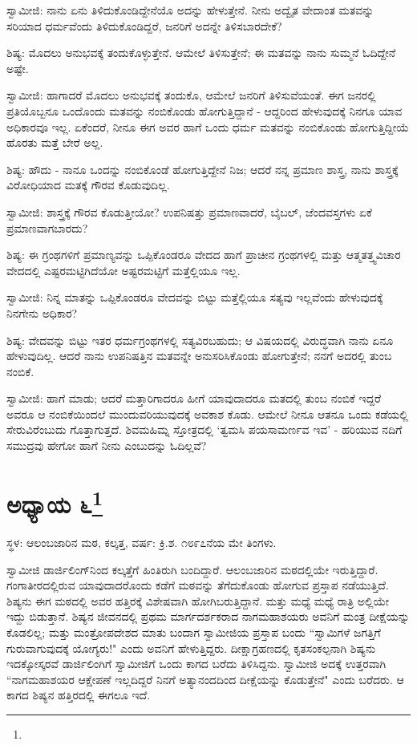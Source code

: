 ಸ್ವಾಮೀಜಿ: ನಾನು ಏನು ತಿಳಿದುಕೊಂಡಿದ್ದೇನೆಯೊ ಅದನ್ನು ಹೇಳುತ್ತೇನೆ. ನೀನು ಅದ್ವೈತ ವೇದಾಂತ ಮತವನ್ನು ಸರಿಯಾದ ಧರ್ಮವೆಂದು ತಿಳಿದುಕೊಂಡಿದ್ದರೆ, ಜನರಿಗೆ ಅದನ್ನೇ ತಿಳಿಸಬಾರದೇಕೆ?

ಶಿಷ್ಯ: ಮೊದಲು ಅನುಭವಕ್ಕೆ ತಂದುಕೊಳ್ಳುತ್ತೇನೆ. ಆಮೇಲೆ ತಿಳಿಸುತ್ತೇನೆ; ಈ ಮತವನ್ನು ನಾನು ಸುಮ್ಮನೆ ಓದಿದ್ದೇನೆ ಅಷ್ಟೇ.

ಸ್ವಾಮೀಜಿ: ಹಾಗಾದರೆ ಮೊದಲು ಅನುಭವಕ್ಕೆ ತಂದುಕೊ, ಆಮೇಲೆ ಜನರಿಗೆ ತಿಳಿಸುವೆಯಂತೆ. ಈಗ ಜನರಲ್ಲಿ ಪ್ರತಿಯೊಬ್ಬನೂ ಒಂದೊಂದು ಮತವನ್ನು ನಂಬಿಕೊಂಡು ಹೋಗುತ್ತಿದ್ದಾನೆ - ಆದ್ದರಿಂದ ಹೇಳುವುದಕ್ಕೆ ನಿನಗೂ ಯಾವ ಅಧಿಕಾರವೂ ಇಲ್ಲ. ಏಕೆಂದರೆ, ನೀನೂ ಈಗ ಅವರ ಹಾಗೆ ಒಂದು ಧರ್ಮ ಮತವನ್ನು ನಂಬಿಕೊಂಡು ಹೋಗುತ್ತಿದ್ದೀಯೆ ಹೊರತು ಮತ್ತೆ ಬೇರೆ ಅಲ್ಲ.

ಶಿಷ್ಯ: ಹೌದು - ನಾನೂ ಒಂದನ್ನು ನಂಬಿಕೊಂಡೆ ಹೋಗುತ್ತಿದ್ದೇನೆ ನಿಜ; ಆದರೆ ನನ್ನ ಪ್ರಮಾಣ ಶಾಸ್ತ್ರ, ನಾನು ಶಾಸ್ತ್ರಕ್ಕೆ ವಿರೋಧಿಯಾದ ಮತಕ್ಕೆ ಗೌರವ ಕೊಡುವುದಿಲ್ಲ.

ಸ್ವಾಮೀಜಿ: ಶಾಸ್ತ್ರಕ್ಕೆ ಗೌರವ ಕೊಡುತ್ತೀಯೋ? ಉಪನಿಷತ್ತು ಪ್ರಮಾಣವಾದರೆ, ಬೈಬಲ್, ಜೆಂದವಸ್ತಗಳು ಏಕೆ ಪ್ರಮಾಣವಾಗಬಾರದು?

ಶಿಷ್ಯ: ಈ ಗ್ರಂಥಗಳಿಗೆ ಪ್ರಮಾಣ್ಯವನ್ನು ಒಪ್ಪಿಕೊಂಡರೂ ವೇದದ ಹಾಗೆ ಪ್ರಾಚೀನ ಗ್ರಂಥಗಳಲ್ಲಿ ಮತ್ತು ಆತ್ಮತತ್ತ್ವವಿಚಾರ ವೇದದಲ್ಲಿ ಎಷ್ಟರಮಟ್ಟಿಗಿದೆಯೋ ಅಷ್ಟರಮಟ್ಟಿಗೆ ಮತ್ತೆಲ್ಲಿಯೂ ಇಲ್ಲ.

ಸ್ವಾಮೀಜಿ: ನಿನ್ನ ಮಾತನ್ನು ಒಪ್ಪಿಕೊಂಡರೂ ವೇದವನ್ನು ಬಿಟ್ಟು ಮತ್ತೆಲ್ಲಿಯೂ ಸತ್ಯವು ಇಲ್ಲವೆಂದು ಹೇಳುವುದಕ್ಕೆ ನಿನಗೇನು ಅಧಿಕಾರ?

ಶಿಷ್ಯ: ವೇದವನ್ನು ಬಿಟ್ಟು ಇತರ ಧರ್ಮಗ್ರಂಥಗಳಲ್ಲಿ ಸತ್ಯವಿರಬಹುದು; ಆ ವಿಷಯದಲ್ಲಿ ವಿರುದ್ಧವಾಗಿ ನಾನು ಏನೂ ಹೇಳುವುದಿಲ್ಲ. ಆದರೆ ನಾನು ಉಪನಿಷತ್ತಿನ ಮತವನ್ನೇ ಅನುಸರಿಸಿಕೊಂಡು ಹೋಗುತ್ತೇನೆ; ನನಗೆ ಅದರಲ್ಲಿ ತುಂಬ ನಂಬಿಕೆ.

ಸ್ವಾಮೀಜಿ: ಹಾಗೆ ಮಾಡು; ಆದರೆ ಮತ್ತಾರಿಗಾದರೂ ಹೀಗೆ ಯಾವುದಾದರೂ ಮತದಲ್ಲಿ ತುಂಬ ನಂಬಿಕೆ ಇದ್ದರೆ ಅವರೂ ಆ ನಂಬಿಕೆಯಿಂದಲೆ ಮುಂದುವರಿಯುವುದಕ್ಕೆ ಅವಕಾಶ ಕೊಡು. ಆಮೇಲೆ ನೀನೂ ಆತನೂ ಒಂದು ಕಡೆಯಲ್ಲಿ ಸೇರುವಿರೆಂಬುದು ಗೊತ್ತಾಗುತ್ತದೆ. ಶಿವಮಹಿಮ್ನ ಸ್ತೋತ್ರದಲ್ಲಿ ‘ತ್ವಮಸಿ ಪಯಸಾಮರ್ಣವ ಇವ’ - ಹರಿಯುವ ನದಿಗೆ ಸಮುದ್ರವು ಹೇಗೋ ಹಾಗೆ ನೀನು ಎಂಬುದನ್ನು ಓದಿಲ್ಲವೆ?

\newpage

\chapter[ಅಧ್ಯಾಯ ೬]{ಅಧ್ಯಾಯ ೬\protect\footnote{}}

\begin{center}
ಸ್ಥಳ: ಆಲಂಬಜಾರಿನ ಮಠ, ಕಲ್ಕತ್ತ, ವರ್ಷ: ಕ್ರಿ.ಶ. ೧೮೯೭ನೆಯ ಮೇ ತಿಂಗಳು.
\end{center}

ಸ್ವಾಮೀಜಿ ಡಾರ್ಜಿಲಿಂಗ್‌ನಿಂದ ಕಲ್ಕತ್ತೆಗೆ ಹಿಂತಿರುಗಿ ಬಂದಿದ್ದಾರೆ. ಆಲಂಬಜಾರಿನ ಮಠದಲ್ಲಿಯೇ ಇರುತ್ತಿದ್ದಾರೆ. ಗಂಗಾತೀರದಲ್ಲಿರುವ ಯಾವುದಾದರೊಂದು ಕಡೆಗೆ ಮಠವನ್ನು ತೆಗೆದುಕೊಂಡು ಹೋಗುವ ಪ್ರಸ್ತಾಪ ನಡೆಯುತ್ತಿದೆ. ಶಿಷ್ಯನು ಈಗ ಮಠದಲ್ಲಿ ಅವರ ಹತ್ತಿರಕ್ಕೆ ವಿಶೇಷವಾಗಿ ಹೋಗಿಬರುತ್ತಿದ್ದಾನೆ. ಮತ್ತು ಮಧ್ಯೆ ಮಧ್ಯೆ ರಾತ್ರಿ ಅಲ್ಲಿಯೇ ಇದ್ದು ಬಿಡುತ್ತಾನೆ. ಶಿಷ್ಯನ ಜೀವನದಲ್ಲಿ ಪ್ರಥಮ ಮಾರ್ಗದರ್ಶಕರಾದ ನಾಗಮಹಾಶಯರು ಅವನಿಗೆ ಮಂತ್ರ ದೀಕ್ಷೆಯನ್ನು ಕೊಡಲಿಲ್ಲ; ಮತ್ತು ಮಂತ್ರೋಪದೇಶದ ಮಾತು ಬಂದಾಗ ಸ್ವಾಮೀಜಿಯ ಪ್ರಸ್ತಾಪ ಬಂದು “ಸ್ವಾಮಿಗಳೆ ಜಗತ್ತಿಗೆ ಗುರುವಾಗುವುದಕ್ಕೆ ಯೋಗ್ಯರು!" ಎಂದು ಅವನಿಗೆ ಹೇಳುತ್ತಿದ್ದರು. ದೀಕ್ಷಾಗ್ರಹಣದಲ್ಲಿ ಕೃತಸಂಕಲ್ಪನಾಗಿ ಶಿಷ್ಯನು ಇದಕ್ಕೋಸ್ಕರವೆ ಡಾರ್ಜಿಲಿಂಗಿಗೆ ಸ್ವಾಮೀಜಿಗೆ ಒಂದು ಕಾಗದ ಬರೆದು ತಿಳಿಸಿದ್ದನು. ಸ್ವಾಮೀಜಿ ಅದಕ್ಕೆ ಉತ್ತರವಾಗಿ “ನಾಗಮಹಾಶಯರ ಆಕ್ಷೇಪಣೆ ಇಲ್ಲದಿದ್ದರೆ ನಿನಗೆ ಅತ್ಯಾನಂದದಿಂದ ದೀಕ್ಷೆಯನ್ನು ಕೊಡುತ್ತೇನೆ" ಎಂದು ಬರೆದರು. ಆ ಕಾಗದ ಶಿಷ್ಯನ ಹತ್ತಿರದಲ್ಲಿ ಈಗಲೂ ಇದೆ.

